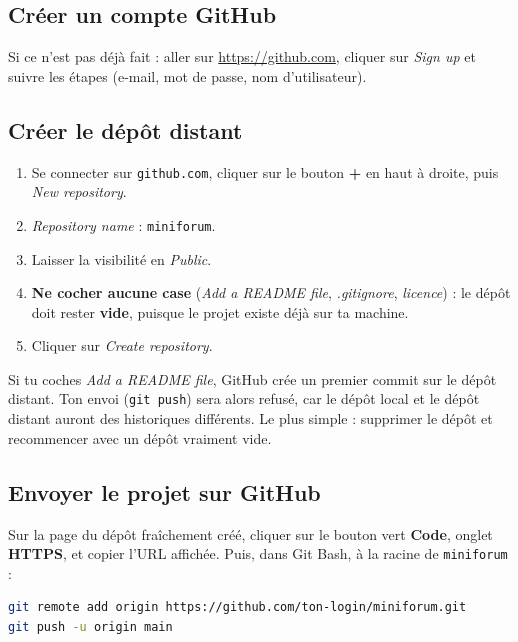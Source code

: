 \documentclass[a4paper,11pt]{article}
\begin{document}
\subsection{Créer un compte GitHub}

Si ce n'est pas déjà fait : aller sur \url{https://github.com}, cliquer sur \textit{Sign up} et suivre les étapes (e-mail, mot de passe, nom d'utilisateur).

\subsection{Créer le dépôt distant}

\begin{enumerate}
  \item Se connecter sur \texttt{github.com}, cliquer sur le bouton \textbf{+} en haut à droite, puis \textit{New repository}.
  \item \textit{Repository name} : \texttt{miniforum}.
  \item Laisser la visibilité en \textit{Public}.
  \item \textbf{Ne cocher aucune case} (\textit{Add a README file}, \textit{.gitignore}, \textit{licence}) : le dépôt doit rester \textbf{vide}, puisque le projet existe déjà sur ta machine.
  \item Cliquer sur \textit{Create repository}.
\end{enumerate}

\begin{tcolorbox}[attention, title={Piège fréquent}]
Si tu coches \textit{Add a README file}, GitHub crée un premier commit sur le dépôt distant. Ton envoi (\texttt{git push}) sera alors refusé, car le dépôt local et le dépôt distant auront des historiques différents. Le plus simple : supprimer le dépôt et recommencer avec un dépôt vraiment vide.
\end{tcolorbox}

\subsection{Envoyer le projet sur GitHub}

Sur la page du dépôt fraîchement créé, cliquer sur le bouton vert \textbf{Code}, onglet \textbf{HTTPS}, et copier l'URL affichée. Puis, dans Git Bash, à la racine de \texttt{miniforum} :

\begin{lstlisting}[language=bash, numbers=none]
git remote add origin https://github.com/ton-login/miniforum.git
git push -u origin main
\end{lstlisting}
\end{document}
